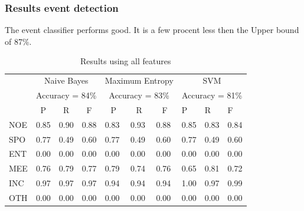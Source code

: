 \documentclass[
10pt, %
a4paper, %
oneside, %
headinclude,footinclude, %
BCOR5mm, %
]{scrartcl}
\begin{document}
\subsubsection{Results event detection}
The event classifier performs good. It is a few procent less then the Upper bound  of 87\%. 

\begin{table}[h]
\caption[Results using all features]{Results using all features }
\begin{tabular}{l|l|l|l|l|l|l|l|l|l|}
\cline{2-10}
                          & \multicolumn{3}{c|}{Naive Bayes}                                         & \multicolumn{3}{c|}{Maximum Entropy}                                     & \multicolumn{3}{c|}{SVM}             \\ \cline{2-10} 
                          & \multicolumn{3}{c|}{Accuracy = 84\%}                                     & \multicolumn{3}{c|}{Accuracy = 83\%}                                     & \multicolumn{3}{c|}{Accuracy = 81\%} \\ \cline{2-10} 
                          & \multicolumn{1}{c|}{P} & \multicolumn{1}{c|}{R} & \multicolumn{1}{c|}{F} & \multicolumn{1}{c|}{P} & \multicolumn{1}{c|}{R} & \multicolumn{1}{c|}{F} & P          & R          & F          \\ \hline
\multicolumn{1}{|l|}{NOE} & 0.85                   & 0.90                   & 0.88                   & 0.83                   & 0.93                   & 0.88                   & 0.85       & 0.83       & 0.84       \\ \hline
\multicolumn{1}{|l|}{SPO} & 0.77                   & 0.49                   & 0.60                   & 0.77                   & 0.49                   & 0.60                   & 0.77       & 0.49       & 0.60       \\ \hline
\multicolumn{1}{|l|}{ENT} & 0.00                   & 0.00                   & 0.00                   & 0.00                   & 0.00                   & 0.00                   & 0.00       & 0.00       & 0.00       \\ \hline
\multicolumn{1}{|l|}{MEE} & 0.76                   & 0.79                   & 0.77                   & 0.79                   & 0.74                   & 0.76                   & 0.65       & 0.81       & 0.72       \\ \hline
\multicolumn{1}{|l|}{INC} & 0.97                   & 0.97                   & 0.97                   & 0.94                   & 0.94                   & 0.94                   & 1.00       & 0.97       & 0.99       \\ \hline
\multicolumn{1}{|l|}{OTH} & 0.00                   & 0.00                   & 0.00                   & 0.00                   & 0.00                   & 0.00                   & 0.00       & 0.00       & 0.00       \\ \hline
\end{tabular}

\end{table}
\end{document}
